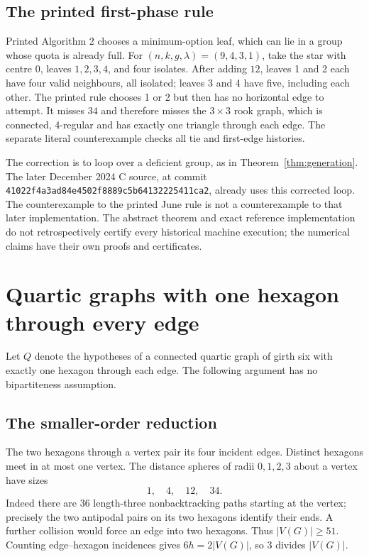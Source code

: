 \documentclass[11pt,a4paper]{article}
\begin{document}
\subsection{The printed first-phase rule}
Printed Algorithm 2 chooses a minimum-option leaf, which can lie in a
group whose quota is already full. For $(n,k,g,\lambda)=(9,4,3,1)$,
take the star with centre 0, leaves $1,2,3,4$, and four isolates. After
adding $12$, leaves 1 and 2 each have four valid neighbours, all isolated;
leaves 3 and 4 have five, including each other. The printed rule chooses
1 or 2 but then has no horizontal edge to attempt. It misses $34$ and
therefore misses the $3\times3$ rook graph, which is connected,
4-regular and has exactly one triangle through each edge. The separate
literal counterexample checks all tie and first-edge histories.

The correction is to loop over a deficient group, as in
Theorem~\ref{thm:generation}. The later December 2024 C source, at
commit \texttt{41022f4a3ad84e4502f8889c5b64132225411ca2}, already uses
this corrected loop. The counterexample to the printed June rule is
not a counterexample to that later implementation. The abstract theorem
and exact reference implementation do not retrospectively certify every
historical machine execution; the numerical claims have their own proofs
and certificates.

\section{Quartic graphs with one hexagon through every edge}
Let $Q$ denote the hypotheses of a connected quartic graph of girth six
with exactly one hexagon through each edge. The following argument has
no bipartiteness assumption.

\subsection{The smaller-order reduction}
The two hexagons through a vertex pair its four incident edges. Distinct
hexagons meet in at most one vertex. The distance spheres of radii
$0,1,2,3$ about a vertex have sizes
\[
                         1,\quad4,\quad12,\quad34.
\]
Indeed there are 36 length-three nonbacktracking paths starting at the
vertex; precisely the two antipodal pairs on its two hexagons identify
their ends. A further collision would force an edge into two hexagons.
Thus $|V(G)|\ge51$. Counting edge--hexagon incidences gives
$6h=2|V(G)|$, so $3$ divides $|V(G)|$.
\end{document}
